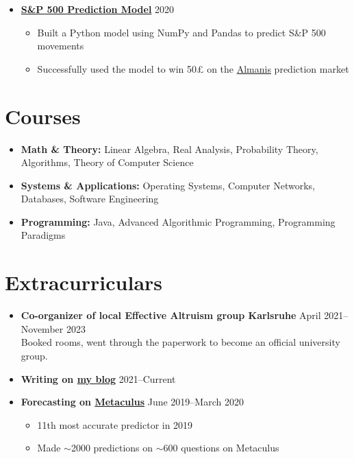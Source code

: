 \documentclass[letterpaper, 9pt]{article}
\begin{document}
\begin{itemize}
\ifdefined\AustraliaVersion\else
    \item \textbf{\href{https://sonofhypnos.github.io/blog/prediction/python/2021/01/30/sp500.html}{S\&P 500 Prediction Model}} \hfill 2020
    \begin{itemize}
        \item Built a Python model using NumPy and Pandas to predict S\&P 500 movements
        \item Successfully used the model to win 50£ on the \href{https://www.almanisprivate.com/}{Almanis} prediction market
    \end{itemize}
\fi

  \end{itemize}

\section*{Courses}
\begin{itemize}
    \item \textbf{Math \& Theory:} Linear Algebra, Real Analysis, Probability Theory, Algorithms, Theory of Computer Science
    \item \textbf{Systems \& Applications:} Operating Systems, Computer Networks, Databases, Software Engineering
    \item \textbf{Programming:} Java, Advanced Algorithmic Programming, Programming Paradigms
\end{itemize}


\section*{Extracurriculars}
  \begin{itemize}
      \item {\textbf{Co-organizer of local Effective Altruism group Karlsruhe}} \hfill April 2021--November 2023 \\
      {Booked rooms, went through the paperwork to become an official university group.}
      \item {\textbf{Writing on \href{https://www.tassiloneubauer.com/}{my blog}}} \hfill 2021--Current
      \item \textbf{Forecasting on \href{https://www.metaculus.com/accounts/profile/106992/}{Metaculus}} \hfill June 2019--March 2020
      \begin{itemize}
              \item 11th most accurate predictor in 2019
              \item Made $\sim$2000 predictions on $\sim$600 questions on Metaculus
      \end{itemize}
  \end{itemize}
\end{document}
